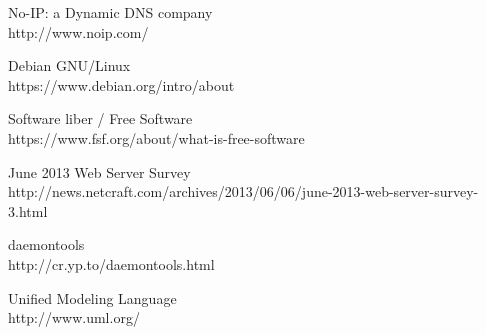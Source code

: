 \documentclass[12pt,a4paper]{article}
\begin{document}
\begin{thebibliography}{99}
	No-IP: a Dynamic DNS company \\
	http://www.noip.com/
	
	Debian GNU/Linux \\
	https://www.debian.org/intro/about

	Software liber / Free Software \\
	https://www.fsf.org/about/what-is-free-software
	
	June 2013 Web Server Survey\\
http://news.netcraft.com/archives/2013/06/06/june-2013-web-server-survey-3.html
	
	daemontools\\
	http://cr.yp.to/daemontools.html
	
	Unified Modeling Language\\
	http://www.uml.org/

\end{thebibliography}
\endgroup
\newpage
\tableofcontents
\end{document}
